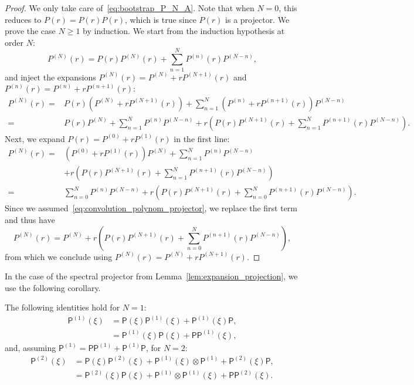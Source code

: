 \documentclass[AHL,Unicode,longabstracts,published]{cedram}
\newcommand{\PP}{\mathsf{P}}
\renewcommand*\ge{\geqslant}
\begin{document}
\begin{proof}
We only take care of~\eqref{eq:bootstrap_P_N_A}. Note that when $N=0$, this reduces to $P(r) = P(r) P(r)$, which is true since $P(r)$ is a projector. We prove the case $N \ge 1$ by induction. We start from the induction hypothesis at order $N$:
\[
P^{(N)}(r) = P(r) P^{(N)}(r) + \sum_{n=1}^{N} P^{(n)} (r) P^{(N-n)},
\]
and inject the expansions $P^{(N)}(r) = P^{(N)} + r P^{(N+1)}(r)$ and $P^{(n)}(r) = P^{(n)} + r P^{(n+1)}(r)$:
\begin{align*}
P^{(N)}(r) = & P(r) \left(P^{(N)} + r P^{(N+1)}(r) \right) + \sum_{n=1}^{N} \left(P^{(n)} + r P^{(n+1)}(r)\right) P^{(N-n)} \\
=& P(r) P^{(N)} + \sum_{n=1}^{N} P^{(n)} P^{(N-n)} + r \left(P(r) P^{(N+1)}(r) + \sum_{n=1}^{N} P^{(n+1)}(r) P^{(N-n)} \right).
\end{align*}
Next, we expand $P(r) = P^{(0)} + r P^{(1)}(r)$ in the first line:
\begin{align*}
P^{(N)}(r) =& \left(P^{(0)} + r P^{(1)}(r) \right) P^{(N)} + \sum_{n=1}^{N} P^{(n)} P^{(N-n)} \\
&+ r \left(P(r) P^{(N+1)}(r) + \sum_{n=1}^{N} P^{(n+1)}(r) P^{(N-n)} \right) \\
= & \sum_{n=0}^{N} P^{(n)} P^{(N-n)} + r \left(P(r) P^{(N+1)}(r) + \sum_{n=0}^{N} P^{(n+1)}(r) P^{(N-n)} \right).
\end{align*}
Since we assumed~\eqref{eq:convolution_polynom_projector}, we replace the first term and thus have
\[
P^{(N)}(r) = P^{(N)} + r \left(P(r) P^{(N+1)}(r) + \sum_{n=0}^{N} P^{(n+1)}(r) P^{(N-n)} \right),
\]
from which we conclude using $P^{(N)}(r) = P^{(N)} + r P^{(N+1)}(r)$.
\end{proof}

In the case of the spectral projector from Lemma~\ref{lem:expansion_projection}, we use the following corollary.
\begin{coro}
The following identities hold for $N=1$:
\begin{align}
\PP^{(1)}(\xi) & = \PP(\xi) \PP^{(1)}(\xi) + \PP^{(1)}(\xi) \PP,\label{eq:bootstrap_P_1_A}\\
& = \PP^{(1)}(\xi) \PP(\xi) + \PP \PP^{(1)}(\xi),\label{eq:bootstrap_P_1_B}
\end{align}
and, assuming $\PP^{(1)} = \PP \PP^{(1)} + \PP^{(1)} \PP$, for $N=2$:
\begin{align}
\PP^{(2)}(\xi) & = \PP(\xi) \PP^{(2)}(\xi) + \PP^{(1)}(\xi) \otimes \PP^{(1)} + \PP^{(2)}(\xi) \PP,\label{eq:bootstrap_P_2_A}\\
& = \PP^{(2)}(\xi) \PP(\xi) + \PP^{(1)} \otimes \PP^{(1)}(\xi) + \PP \PP^{(2)}(\xi).\label{eq:bootstrap_P_2_B}
\end{align}
\end{coro}
\end{document}
